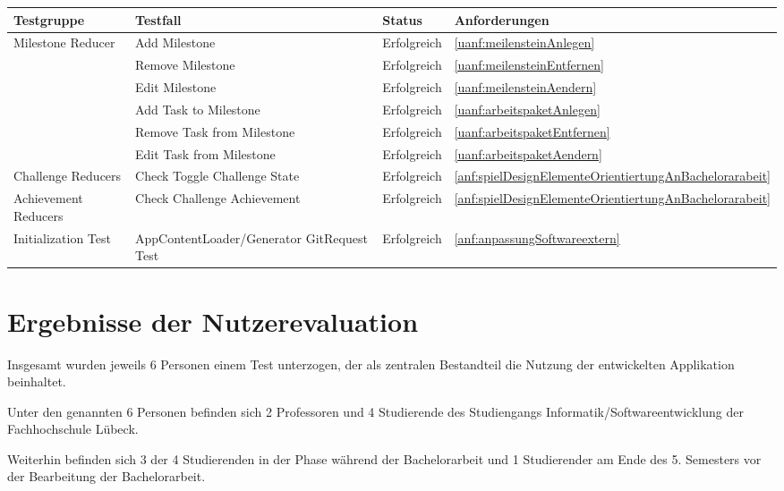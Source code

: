 \documentclass[bibliography=totoc,listof=totoc,BCOR=5mm,DIV=12,oneside]{scrbook}
\begin{document}
\bigskip
\begin{tabularx}{\textwidth}{l|X|l|l}
	\toprule
	\textbf{Testgruppe} & \textbf{Testfall} & \textbf{Status} & \textbf{Anforderungen}\\ 
	\midrule
 	Milestone Reducer & Add Milestone & Erfolgreich & \ref{uanf:meilensteinAnlegen}\\ 
 	& Remove Milestone & Erfolgreich & \ref{uanf:meilensteinEntfernen}\\ 
 	& Edit Milestone & Erfolgreich & \ref{uanf:meilensteinAendern}\\
 	& Add Task to Milestone & Erfolgreich & \ref{uanf:arbeitspaketAnlegen}\\
 	& Remove Task from Milestone & Erfolgreich & \ref{uanf:arbeitspaketEntfernen}\\
 	& Edit Task from Milestone & Erfolgreich & \ref{uanf:arbeitspaketAendern}\\ 
 	\midrule
 	Challenge Reducers & Check Toggle Challenge State & Erfolgreich & \ref{anf:spielDesignElementeOrientiertungAnBachelorarabeit}\\
 	\midrule
 	Achievement Reducers & Check Challenge Achievement & Erfolgreich & \ref{anf:spielDesignElementeOrientiertungAnBachelorarabeit}\\
 	\midrule
 	Initialization Test & AppContentLoader/Generator GitRequest Test & Erfolgreich & \ref{anf:anpassungSoftwareextern}
 	\\ 
	\bottomrule
\end{tabularx}
\label{tab:reducertests}

\newpage
\section{Ergebnisse der Nutzerevaluation}
\par Insgesamt wurden jeweils 6 Personen einem Test unterzogen, der als zentralen Bestandteil die Nutzung der entwickelten Applikation beinhaltet. 
\par Unter den genannten 6 Personen befinden sich 2 Professoren und 4 Studierende des Studiengangs Informatik/Softwareentwicklung der Fachhochschule Lübeck. 
\par Weiterhin befinden sich 3 der 4 Studierenden in der Phase während der Bachelorarbeit und 1 Studierender am Ende des 5. Semesters vor der Bearbeitung der Bachelorarbeit.
\end{document}

